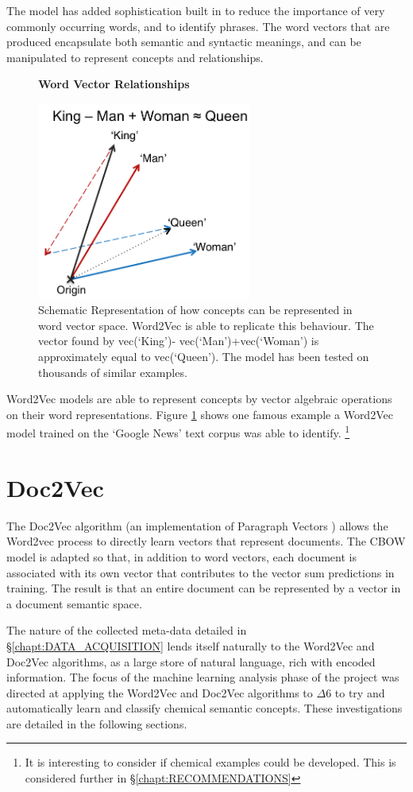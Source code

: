 The model has added sophistication built in to reduce the importance of very commonly occurring words, and to identify phrases. The word vectors that are produced encapsulate both semantic and syntactic meanings, and can be manipulated to represent concepts and relationships.
\begin{figure}[H]
    \centering
    \textbf{Word Vector Relationships}\par\medskip
    \includegraphics[height=6.5cm]{Natural_Language_Processing/KINGQUEEN.png}
    \caption[Word Vector Relationships]{Schematic Representation of how concepts can be represented in word vector space. Word2Vec is able to replicate this behaviour. The vector found by vec(‘King’)- vec(‘Man’)+vec(‘Woman’) is approximately equal to vec(‘Queen’). The model has been tested on thousands of similar examples\cite{word2vec2}\cite{word2veckingqueen}.}
     \label{fig:KINGQUEEN}
\end{figure}
Word2Vec models are able to represent concepts by vector algebraic operations on their word representations. Figure \ref{fig:KINGQUEEN} shows one famous example a Word2Vec model trained on the `Google News' text corpus was able to identify. \footnote{It is interesting to consider if chemical examples could be developed. This is considered further in \S\ref{chapt:RECOMMENDATIONS}}

\section{Doc2Vec}
The Doc2Vec algorithm\cite{gensim} (an implementation of Paragraph Vectors \cite{doc2vec}) allows the Word2vec process to directly learn vectors that represent documents. The CBOW model is adapted so that, in addition to word vectors, each document is associated with its own vector that contributes to the vector sum predictions in training. The result is that an entire document can be represented by a vector in a document semantic space.

The nature of the collected meta-data detailed in \S\ref{chapt:DATA_ACQUISITION} lends itself naturally to the Word2Vec and Doc2Vec algorithms, as a large store of natural language, rich with encoded information. The focus of the machine learning analysis phase of the project was directed at applying the Word2Vec and Doc2Vec algorithms to $\Delta6$ to try and automatically learn and classify chemical semantic concepts. These investigations are detailed in the following sections.
